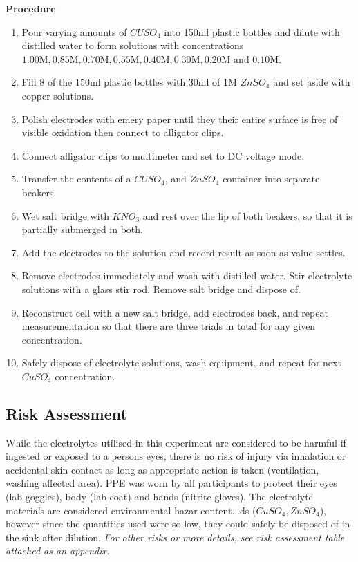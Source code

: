\documentclass[10.5pt,a4paper]{article}
\begin{document}
\textbf{Procedure}
\small
\begin{enumerate}
	\item Pour varying amounts of $CUSO_4$ into 150ml plastic bottles and dilute with distilled water to form solutions with concentrations $1.00\textrm{M}, 0.85\textrm{M}, 0.70\textrm{M}, 0.55\textrm{M}, 0.40\textrm{M}, 0.30\textrm{M}, 0.20\textrm{M and } 0.10\textrm{M}$.
	
	\item Fill 8 of the 150ml plastic bottles with 30ml of 1M $ZnSO_4$ and set aside with copper solutions. 
	
	\item Polish electrodes with emery paper until they their entire surface is free of visible oxidation then connect to alligator clips.
	
	\item Connect alligator clips to multimeter and set to DC voltage mode.
	
	\item Transfer the contents of a $CUSO_4$, and $ZnSO_4$ container into separate beakers.
	
	\item Wet salt bridge with $KNO_3$ and rest over the lip of both beakers, so that it is partially submerged in both. 
	
	\item Add the electrodes to the solution and record result as soon as value settles.
	
	\item Remove electrodes immediately and wash with distilled water. Stir electrolyte solutions with a glass stir rod. Remove salt bridge and dispose of.
	
	\item Reconstruct cell with a new salt bridge, add electrodes back, and repeat measurementation so that there are three trials in total for any given concentration.
	
	\item Safely dispose of electrolyte solutions, wash equipment, and repeat for next $CuSO_4$ concentration.
\end{enumerate}

\subsection{Risk Assessment}
While the electrolytes utilised in this experiment are considered to be harmful if ingested or exposed to a persons eyes, there is no risk of injury via inhalation or accidental skin contact as long as appropriate action is taken (ventilation, washing affected area). PPE was worn by all participants to protect their eyes (lab goggles), body (lab coat) and hands (nitrite gloves). The electrolyte materials are  considered environmental hazar	content...ds ($CuSO_4, ZnSO_4$), however since the quantities used were so low, they could safely be disposed of in the sink after dilution.
\textit{For other risks or more details, see risk assessment table attached as an appendix.}
\end{document}
